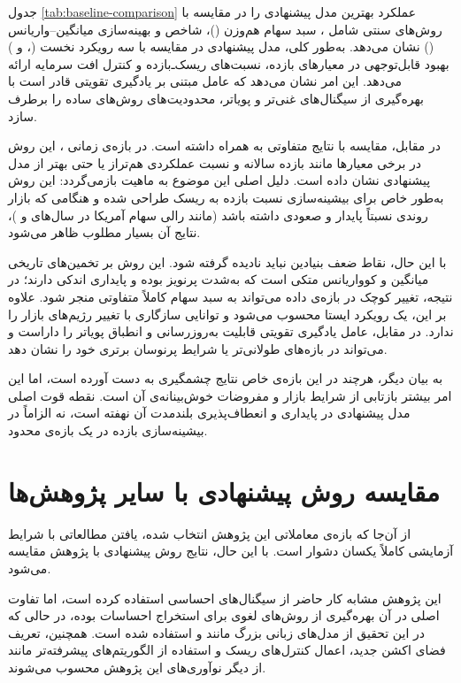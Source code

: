 \documentclass[12pt, a4paper]{report}
\begin{document}
جدول \ref{tab:baseline-comparison} عملکرد بهترین مدل پیشنهادی را در مقایسه با روش‌های سنتی شامل ، سبد سهام هم‌وزن ()، شاخص  و بهینه‌سازی میانگین–واریانس () نشان می‌دهد. 
به‌طور کلی، مدل پیشنهادی در مقایسه با سه رویکرد نخست (،  و ) بهبود قابل‌توجهی در معیارهای بازده، نسبت‌های ریسک‌ـ‌بازده و کنترل افت سرمایه ارائه می‌دهد. 
این امر نشان می‌دهد که عامل مبتنی بر یادگیری تقویتی قادر است با بهره‌گیری از سیگنال‌های غنی‌تر و پویاتر، محدودیت‌های روش‌های ساده را برطرف سازد.  

در مقابل، مقایسه با  نتایج متفاوتی به همراه داشته است. در بازه‌ی زمانی ، این روش در برخی معیارها مانند بازده سالانه و نسبت  عملکردی هم‌تراز یا حتی بهتر از مدل پیشنهادی نشان داده است. دلیل اصلی این موضوع به ماهیت  بازمی‌گردد: این روش به‌طور خاص برای بیشینه‌سازی نسبت بازده به ریسک طراحی شده و هنگامی که بازار روندی نسبتاً پایدار و صعودی داشته باشد (مانند رالی سهام آمریکا در سال‌های  و )، نتایج آن بسیار مطلوب ظاهر می‌شود.  

با این حال، نقاط ضعف بنیادین  نباید نادیده گرفته شود. این روش بر تخمین‌های تاریخی میانگین و کوواریانس متکی است که به‌شدت پرنویز بوده و پایداری اندکی دارند؛ در نتیجه، تغییر کوچک در بازه‌ی داده می‌تواند به سبد سهام کاملاً متفاوتی منجر شود. علاوه بر این،  یک رویکرد ایستا محسوب می‌شود و توانایی سازگاری با تغییر رژیم‌های بازار را ندارد. در مقابل، عامل یادگیری تقویتی قابلیت به‌روزرسانی و انطباق پویاتر را داراست و می‌تواند در بازه‌های طولانی‌تر یا شرایط پرنوسان برتری خود را نشان دهد.  

به بیان دیگر، هرچند  در این بازه‌ی خاص نتایج چشمگیری به دست آورده است، اما این امر بیشتر بازتابی از شرایط بازار و مفروضات خوش‌بینانه‌ی آن است. نقطه قوت اصلی مدل پیشنهادی در پایداری و انعطاف‌پذیری بلندمدت آن نهفته است، نه الزاماً در بیشینه‌سازی بازده در یک بازه‌ی محدود.


\section{مقایسه روش پیشنهادی با سایر پژوهش‌ها}

از آن‌جا که بازه‌ی معاملاتی این پژوهش  انتخاب شده، یافتن مطالعاتی با شرایط آزمایشی کاملاً یکسان دشوار است. 
با این حال، نتایج روش پیشنهادی با پژوهش \cite{koratamaddi2021sentiment} مقایسه می‌شود.  

این پژوهش مشابه کار حاضر از سیگنال‌های احساسی استفاده کرده است، اما تفاوت اصلی در آن بهره‌گیری از روش‌های لغوی برای استخراج احساسات بوده، در حالی که در این تحقیق از مدل‌های زبانی بزرگ مانند  و  استفاده شده است. 
همچنین، تعریف فضای اکشن جدید، اعمال کنترل‌های ریسک و استفاده از الگوریتم‌های پیشرفته‌تر مانند  از دیگر نوآوری‌های این پژوهش محسوب می‌شوند.  
\end{document}
